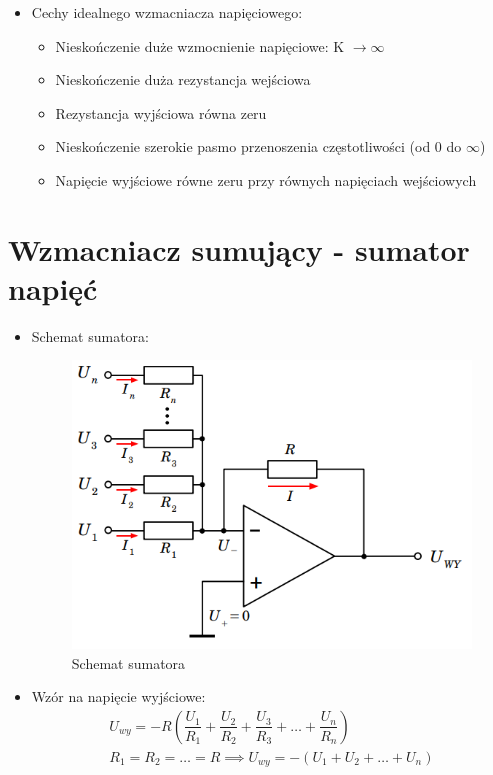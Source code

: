\begin{itemize}
    \item Cechy idealnego wzmacniacza napięciowego:
        \begin{itemize}
            \item Nieskończenie duże wzmocnienie napięciowe: K $\xrightarrow{} \infty$
            \item Nieskończenie duża rezystancja wejściowa
            \item Rezystancja wyjściowa równa zeru
            \item Nieskończenie szerokie pasmo przenoszenia częstotliwości (od 0 do $\infty$)
            \item Napięcie wyjściowe równe zeru przy równych napięciach wejściowych
        \end{itemize}
\end{itemize}

\section{Wzmacniacz sumujący - sumator napięć}

\begin{itemize}
    \item Schemat sumatora:
        \begin{figure}[H]
            \centering
            \includegraphics[scale=0.4]{img/schemes/sumator.png}
            \caption{Schemat sumatora}
            \label{fig:schemat_sumatora}
        \end{figure}
    \item Wzór na napięcie wyjściowe:
        \begin{gather}
            U_{wy} = -R(\dfrac{U_1}{R_1} + \dfrac{U_2}{R_2} + \dfrac{U_3}{R_3} + \dots + \dfrac{U_n}{R_n}) \\
            R_1 = R_2 = \dots = R \implies U_{wy} = -(U_1 + U_2 + \dots + U_n)
        \end{gather}
\end{itemize}


